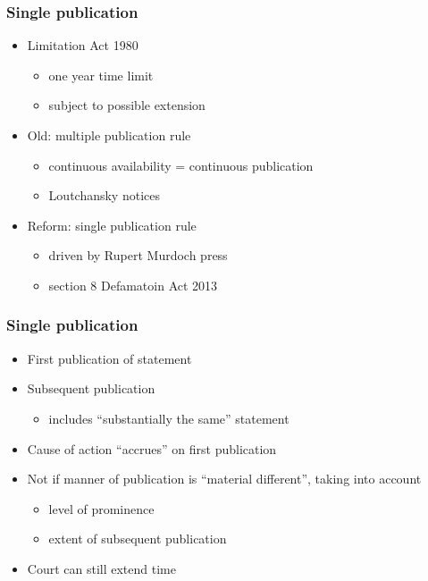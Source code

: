 \documentclass[ignorenonframetext,]{beamer}
\begin{document}
\begin{frame}
\frametitle{Single publication}

\begin{itemize}
\item  Limitation Act 1980
  \begin{itemize}
  \item  one year time limit
  \item  subject to possible extension
  \end{itemize}
\item  Old: multiple publication rule
  \begin{itemize}
  \item continuous availability = continuous publication
  \item Loutchansky notices
  \end{itemize}
\item  Reform: single publication rule
  \begin{itemize}
  \item driven by Rupert Murdoch press
  \item section 8 Defamatoin Act 2013
  \end{itemize}
\end{itemize}

\end{frame}

\begin{frame}
  \frametitle{Single publication}
  \begin{itemize}
  \item First publication of statement
  \item Subsequent publication
    \begin{itemize}
    \item includes ``substantially the same'' statement
    \end{itemize}
  \item Cause of action ``accrues'' on first publication
  \item Not if manner of publication is ``material different'', taking into account
    \begin{itemize}
    \item level of prominence
    \item extent of subsequent publication
    \end{itemize}
  \item Court can still extend time
  \end{itemize}
\end{frame}
\end{document}
